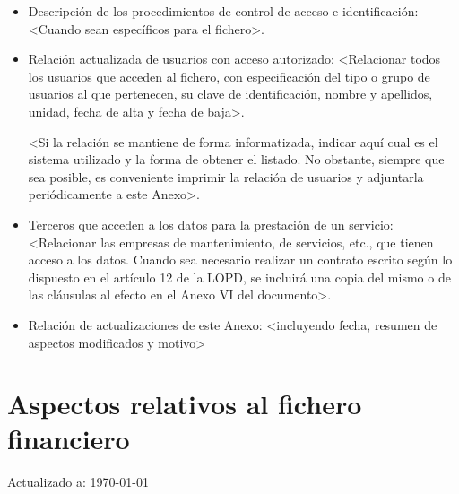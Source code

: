 \documentclass[a4paper,11pt,bibtotoc,noliststotoc]{scrbook}
\begin{document}
\begin{itemize}
\item Descripción de los procedimientos de control de acceso e identificación: <Cuando sean específicos para el fichero>.

\item Relación actualizada de usuarios con acceso autorizado: <Relacionar todos los usuarios que acceden al fichero, con especificación del tipo o grupo de usuarios al que pertenecen, su clave de identificación, nombre y apellidos, unidad, fecha de alta y fecha de baja>.

<Si la relación se mantiene de forma informatizada, indicar aquí cual es el sistema utilizado y la forma de obtener el listado. No obstante, siempre que sea posible, es conveniente imprimir la relación de usuarios y adjuntarla periódicamente a este Anexo>.

\item Terceros que acceden a los datos para la prestación de un servicio: <Relacionar las empresas de mantenimiento, de servicios, etc., que tienen acceso a los datos. Cuando sea necesario realizar un contrato escrito según lo dispuesto en el artículo 12 de la LOPD, se incluirá una copia del mismo o de las cláusulas al efecto en el Anexo VI del documento>.

\item Relación de actualizaciones de este Anexo: <incluyendo fecha, resumen de aspectos modificados y motivo>

\end{itemize}







\section{Aspectos relativos al fichero financiero}


Actualizado a: \today
\end{document}
